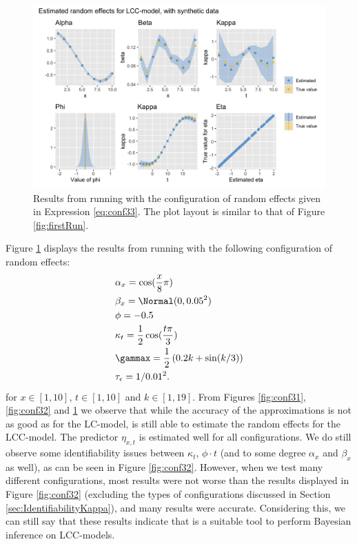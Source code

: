 \begin{figure}[h!]
    \centering
    \includegraphics[width=0.85\linewidth]{synthetic-data/Figures/effects-LCC-synthetic-3-3.png}
    \caption{Results from running \inlabru with the configuration of random effects given in Expression \ref{eq:conf33}. The plot layout is similar to that of Figure \ref{fig:firstRun}.}
    \label{fig:conf33}
\end{figure}
Figure \ref{fig:conf33} displays the results from running \inlabru with the following configuration of random effects:
\begin{equation}
    \begin{aligned}
        &\alpha_x = \cos(\frac{x}{8}\pi)\\
        &\beta_x = \Normal(0,0.05^2)\\
        &\phi = -0.5\\
        &\kappa_t = \frac{1}{2}\cos(\frac{t\pi}{3})\\
        &\gammax = \frac{1}{2}\left( 0.2k + \sin(k/3)\right)\\
        &\tau_{\epsilon} = 1/0.01^2.
    \end{aligned}
    \label{eq:conf33}
\end{equation}
for $x\in[1,10]$, $t \in [1,10]$ and $k \in [1,19]$. 
From Figures \ref{fig:conf31}, \ref{fig:conf32} and \ref{fig:conf33} we observe that while the accuracy of the approximations is not as good as for the LC-model, \inlabru is still able to estimate the random effects for the LCC-model. The predictor $\eta_{x,t}$ is estimated well for all configurations. We do still observe some identifiability issues between $\kappa_t$, $\phi \cdot t$ (and to some degree $\alpha_x$ and $\beta_x$ as well), as can be seen in Figure \ref{fig:conf32}. However, when we test many different configurations, most results were not worse than the results displayed in Figure \ref{fig:conf32} (excluding the types of configurations discussed in Section \ref{sec:IdentifiabilityKappa}), and many results were accurate.  Considering this, we can still say that these results indicate that \inlabru is a suitable tool to perform Bayesian inference on LCC-models. 
